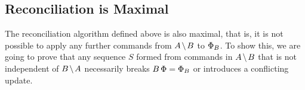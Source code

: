 
\subsection{Reconciliation is Maximal}



The reconciliation algorithm defined above is also maximal, that is,
it is not possible to apply any further commands from $\ambnp$ to $\Phi_B$.
To show this, we are going to prove that any sequence $S$ formed from commands
in $\ambnp$ that is not independent of $\bmanp$ necessarily breaks $B\,\Phi=\Phi_B$
or introduces a conflicting update.

